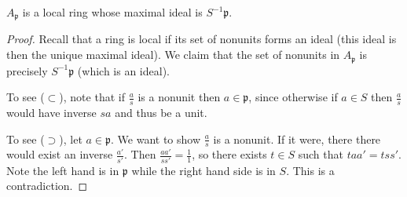 \documentclass[12pt]{article}
\begin{document}
\begin{proposition}
	$A_\mathfrak{p}$ is a local ring whose maximal ideal is $S^{-1}\mathfrak{p}$.
\end{proposition}
\begin{proof}
	Recall that a ring is local if its set of nonunits forms an ideal (this ideal is then the unique maximal ideal). We claim that the set of nonunits in $A_\mathfrak{p}$ is precisely $S^{-1}\mathfrak{p}$ (which is an ideal).

	To see ($\subset$), note that if $\frac{a}{s}$ is a nonunit then $a\in\mathfrak{p}$, since otherwise if $a\in S$ then $\frac{a}{s}$ would have inverse ${s}{a}$ and thus be a unit.

	To see ($\supset$), let $a\in\mathfrak{p}$. We want to show $\frac{a}{s}$ is a nonunit. If it were, there there would exist an inverse $\frac{a'}{s'}$. Then $\frac{aa'}{ss'}=\frac{1}{1}$, so there exists $t\in S$ such that $taa'=tss'$. Note the left hand is in $\mathfrak{p}$ while the right hand side is in $S$. This is a contradiction.
\end{proof}
\end{document}
